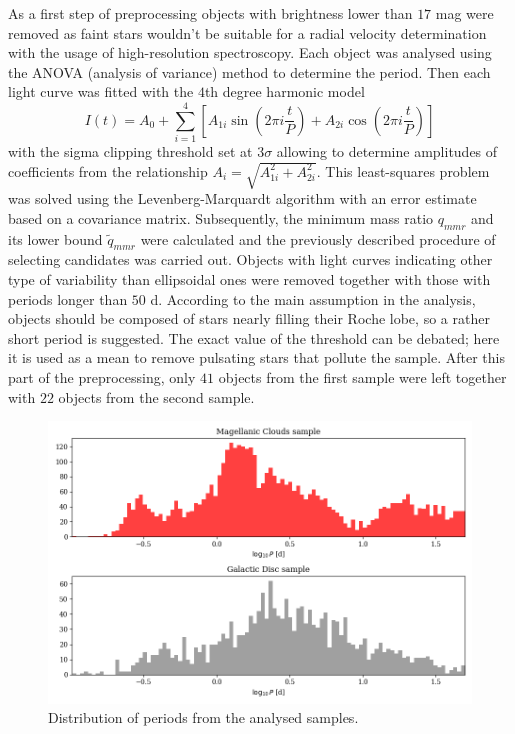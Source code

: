 \documentclass{pracalicmgr}
\begin{document}
As a first step of preprocessing objects with brightness lower than
$17$ mag  were removed as faint stars wouldn't be suitable for a radial velocity determination with the usage of high-resolution spectroscopy.
Each object was analysed using the ANOVA (analysis of variance) method \citep{schwarzenberg-czerny_advantage_1989} to determine the period.
Then each light curve was fitted with the $4$th degree harmonic model
\begin{equation}\label{harm}
    I(t)=A_0+\sum_{i=1}^4\left[ A_{1i}\sin{\left(2\pi i\frac{t}{P}\right)}+A_{2i}\cos{\left(2\pi i\frac{t}{P}\right)}\right]
\end{equation}
with the sigma clipping threshold set at $3\sigma$ allowing to determine amplitudes of coefficients from the relationship $A_i=\sqrt{A_{1i}^2+A_{2i}^2}$.
This least-squares problem was solved using the Levenberg-Marquardt algorithm with an error estimate based on a covariance matrix.
Subsequently, the minimum mass ratio $q_{mmr}$ and its lower bound $\tilde{q}_{mmr}$ were calculated and the previously described procedure of selecting candidates was carried out.
Objects with light curves indicating other type of variability than ellipsoidal ones were removed together with those with periods longer than
$50$ d. According to the main assumption in the analysis, objects should be composed of stars nearly filling their Roche lobe, so a rather short period is suggested. The exact value of the threshold can be debated; here it is used as a mean to
remove pulsating stars that pollute the sample. After this part of the preprocessing, only $41$ objects from the first sample were left together with $22$ objects from the second sample.
\begin{figure}
    \includegraphics[scale=0.5]{plots/periods.png}
    \caption{Distribution of periods from the analysed samples.}
    \label{periods}
\end{figure}
\end{document}
